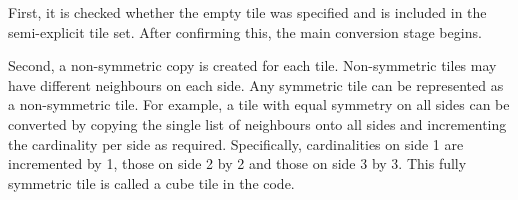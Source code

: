First, it is checked whether the empty tile was specified and is included in the semi-explicit tile set. After confirming this, the main conversion stage begins.

Second, a non-symmetric copy is created for each tile. Non-symmetric tiles may have different neighbours on each side. Any symmetric tile can be represented as a non-symmetric tile. For example, a tile with equal symmetry on all sides can be converted by copying the single list of neighbours onto all sides and incrementing the cardinality per side as required. Specifically, cardinalities on side 1 are incremented by 1, those on side 2 by 2 and those on side 3 by 3. This fully symmetric tile is called a cube tile in the code.

\begin{figure}[H]
\end{figure}
